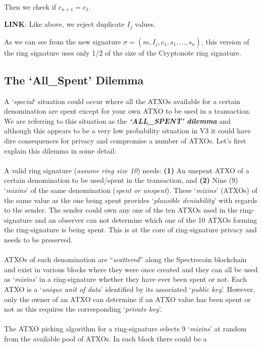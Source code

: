 Then we check if $c_{n+1}=c_1$.

\hfill \break\textbf{LINK}: 
Like above, we reject duplicate $I_j$ values.


\hfill \break As we can see from the new signature $\sigma = 
(m,I_j,c_1,s_1,...,s_n)$, this version of the ring signature 
uses only 1/2 of the size of the Cryptonote ring signature.
\newpage

\subsection{The ‘All\_Spent’ Dilemma}
A ‘\textit{special}‘ situation could occur where all the ATXOs available for a
certain denomination are spent except for your own ATXO to be used in a transaction.
We are referring to this situation as the \textbf{\textit{‘ALL\_SPENT’ dilemma}}
and although this appears to be a very low probability situation in V3 it could
have dire consequences for privacy and compromise a number of ATXOs. Let’s first
explain this dilemma in some detail:
\\
\\
\noindent
A valid ring signature (\textit{assume ring size 10}) needs: \textbf{(1)} An
unspent ATXO of a certain denomination to be used/spent in the transaction,
and \textbf{(2)} Nine (9) ‘\textit{mixins}’ of the same denomination
(\textit{spent or unspent}). These ‘\textit{mixins}’ (ATXOs) of the same
value as the one being spent provides ‘\textit{plausible deniability}’ with
regards to the sender. The sender could own any one of the ten ATXOs used
in the ring-signature and an observer can not determine which one of the
10 ATXOs forming the ring-signature is being spent. This is at the core of
ring-signature privacy and needs to be preserved.
\\
\\
\noindent
ATXOs of each denomination are “\textit{scattered}” along the Spectrecoin
blockchain and exist in various blocks where they were once created and
they can all be used as ‘\textit{mixins}’ in a ring-signature whether they
have ever been spent or not. Each ATXO is a ‘\textit{unique unit of data}’
identified by its associated ‘\textit{public key}’. However, only the
owner of an ATXO can determine if an ATXO value has been spent or not
as this requires the corresponding ‘\textit{private key}’.
\\
\\
\noindent
The ATXO picking algorithm for a ring-signature selects 9 ‘\textit{mixins}’
at random from the available pool of ATXOs. In each block there could be a
